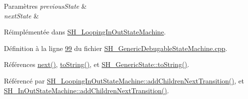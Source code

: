 \begin{DoxyParams}{Paramètres}
{\em previous\-State} & \\
\hline
{\em next\-State} & \\
\hline
\end{DoxyParams}


Réimplémentée dans \hyperlink{classSH__LoopingInOutStateMachine_abfae9f47019379f270496de46845c729}{S\-H\-\_\-\-Looping\-In\-Out\-State\-Machine}.



Définition à la ligne \hyperlink{SH__GenericDebugableStateMachine_8cpp_source_l00099}{99} du fichier \hyperlink{SH__GenericDebugableStateMachine_8cpp_source}{S\-H\-\_\-\-Generic\-Debugable\-State\-Machine.\-cpp}.



Références \hyperlink{classSH__GenericStateMachine_af4771d31d87951c997fba1633c2d67f6}{next()}, \hyperlink{classSH__GenericStateMachine_a85c0c1c9d258ae991f84667412fa47cd}{to\-String()}, et \hyperlink{classSH__GenericState_a7779babbb40f3f8faa71112204d9804f}{S\-H\-\_\-\-Generic\-State\-::to\-String()}.



Référencé par \hyperlink{classSH__LoopingInOutStateMachine_abfae9f47019379f270496de46845c729}{S\-H\-\_\-\-Looping\-In\-Out\-State\-Machine\-::add\-Children\-Next\-Transition()}, et \hyperlink{classSH__InOutStateMachine_aa78420f8778d7777809aad77eb8473b4}{S\-H\-\_\-\-In\-Out\-State\-Machine\-::add\-Children\-Next\-Transition()}.


